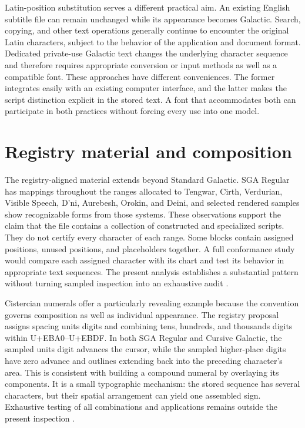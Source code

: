 \documentclass[11pt]{article}
\begin{document}
Latin-position substitution serves a different practical aim. An existing English subtitle file can remain unchanged while its appearance becomes Galactic. Search, copying, and other text operations generally continue to encounter the original Latin characters, subject to the behavior of the application and document format. Dedicated private-use Galactic text changes the underlying character sequence and therefore requires appropriate conversion or input methods as well as a compatible font. These approaches have different conveniences. The former integrates easily with an existing computer interface, and the latter makes the script distinction explicit in the stored text. A font that accommodates both can participate in both practices without forcing every use into one model.

\section{Registry material and composition}

The registry-aligned material extends beyond Standard Galactic. SGA Regular has mappings throughout the ranges allocated to Tengwar, Cirth, Verdurian, Visible Speech, D'ni, Aurebesh, Orokin, and Deini, and selected rendered samples show recognizable forms from those systems. These observations support the claim that the file contains a collection of constructed and specialized scripts. They do not certify every character of each range. Some blocks contain assigned positions, unused positions, and placeholders together. A full conformance study would compare each assigned character with its chart and test its behavior in appropriate text sequences. The present analysis establishes a substantial pattern without turning sampled inspection into an exhaustive audit \cite{ucsur,ucsur-aurebesh}.

Cistercian numerals offer a particularly revealing example because the convention governs composition as well as individual appearance. The registry proposal assigns spacing units digits and combining tens, hundreds, and thousands digits within U+EBA0--U+EBDF. In both SGA Regular and Cursive Galactic, the sampled units digit advances the cursor, while the sampled higher-place digits have zero advance and outlines extending back into the preceding character's area. This is consistent with building a compound numeral by overlaying its components. It is a small typographic mechanism: the stored sequence has several characters, but their spatial arrangement can yield one assembled sign. Exhaustive testing of all combinations and applications remains outside the present inspection \cite{ucsur-cistercian}.
\end{document}
